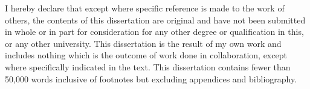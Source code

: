 
\begin{declaration}

I hereby declare that except where specific reference is made to the work of others, the contents of this dissertation are original and have not been submitted in whole or in part for consideration for any other degree or qualification in this, or any other university. This dissertation is the result of my own work and includes nothing which is the outcome of work done in collaboration, except where specifically indicated in the text. This dissertation contains fewer than 50,000 words inclusive of footnotes but excluding appendices and bibliography.


\end{declaration}

